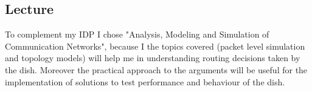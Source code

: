 \documentclass[NET,a4paper,12pt,english]{netforms}
\begin{document}
  \subsection*{Lecture}
  To complement my IDP I chose "Analysis, Modeling and Simulation of Communication Networks", because I the topics covered (packet level simulation and topology models) will help me in understanding routing decisions taken by the dish. Moreover the practical approach to the arguments will be 
  useful for the implementation of solutions to test performance and behaviour of the dish.


\scriptsize

\end{document}
